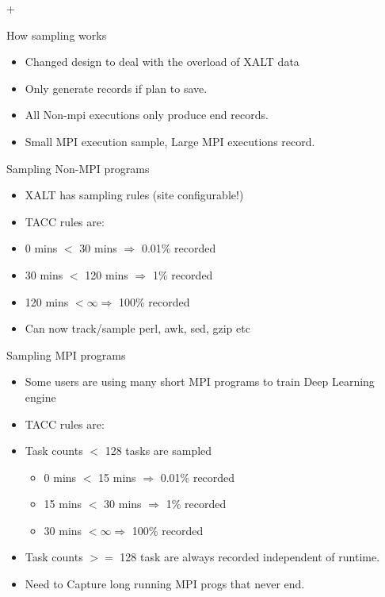 +\documentclass{beamer}
\begin{document}
\begin{frame}{How sampling works}
  \begin{itemize}
    \item Changed design to deal with the overload of XALT data
    \item Only generate records if plan to save.
    \item All Non-mpi executions only produce end records.
    \item Small MPI execution sample, Large MPI executions record.
  \end{itemize}
\end{frame}

\begin{frame}{Sampling Non-MPI programs}
  \begin{itemize}
    \item XALT has sampling rules (site configurable!)
    \item TACC rules are:
    \item 0 mins $<$ 30 mins $\Rightarrow$ 0.01\% recorded  
    \item 30 mins $<$ 120 mins $\Rightarrow$ 1\% recorded  
    \item 120 mins $<  \infty \Rightarrow$ 100\% recorded
    \item Can now track/sample perl, awk, sed, gzip etc
  \end{itemize}
\end{frame}

\begin{frame}{Sampling MPI programs}
  \begin{itemize}
    \item Some users are using many short MPI programs to train Deep
      Learning engine
    \item TACC rules are:
    \item Task counts $<$ 128 tasks are sampled
      \begin{itemize}
        \item 0 mins $<$ 15 mins $\Rightarrow$ 0.01\% recorded  
        \item 15 mins $<$ 30 mins $\Rightarrow$ 1\% recorded  
        \item 30 mins $<  \infty \Rightarrow$ 100\% recorded
      \end{itemize}
    \item Task counts $>=$ 128 task are always recorded independent of runtime.
    \item Need to Capture long running MPI progs that never end.
  \end{itemize}
\end{frame}
\end{document}
